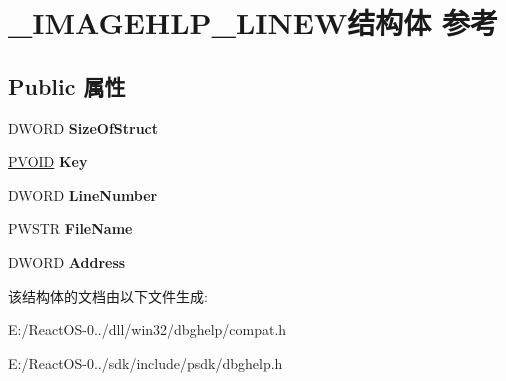 \hypertarget{struct___i_m_a_g_e_h_l_p___l_i_n_e_w}{}\section{\+\_\+\+I\+M\+A\+G\+E\+H\+L\+P\+\_\+\+L\+I\+N\+E\+W结构体 参考}
\label{struct___i_m_a_g_e_h_l_p___l_i_n_e_w}
\subsection*{Public 属性}
\begin{DoxyCompactItemize}
\item 
\mbox{\label{struct___i_m_a_g_e_h_l_p___l_i_n_e_w_a1bc78806058279bcc2f64b659e868d86}} 
D\+W\+O\+RD {\bfseries Size\+Of\+Struct}
\item 
\mbox{\label{struct___i_m_a_g_e_h_l_p___l_i_n_e_w_ab4af25bf31372284cb4f3571b2bfef4d}} 
\hyperlink{interfacevoid}{P\+V\+O\+ID} {\bfseries Key}
\item 
\mbox{\label{struct___i_m_a_g_e_h_l_p___l_i_n_e_w_af9d1a03e8a3eeccadc38e63cf814750e}} 
D\+W\+O\+RD {\bfseries Line\+Number}
\item 
\mbox{\label{struct___i_m_a_g_e_h_l_p___l_i_n_e_w_aad6335f966da968f773e1540f0ec184d}} 
P\+W\+S\+TR {\bfseries File\+Name}
\item 
\mbox{\label{struct___i_m_a_g_e_h_l_p___l_i_n_e_w_a6a23ffc10094e51e6e6f024b14b17b75}} 
D\+W\+O\+RD {\bfseries Address}
\end{DoxyCompactItemize}


该结构体的文档由以下文件生成\+:\begin{DoxyCompactItemize}
\item 
E\+:/\+React\+O\+S-\/0../dll/win32/dbghelp/compat.\+h\item 
E\+:/\+React\+O\+S-\/0../sdk/include/psdk/dbghelp.\+h\end{DoxyCompactItemize}
